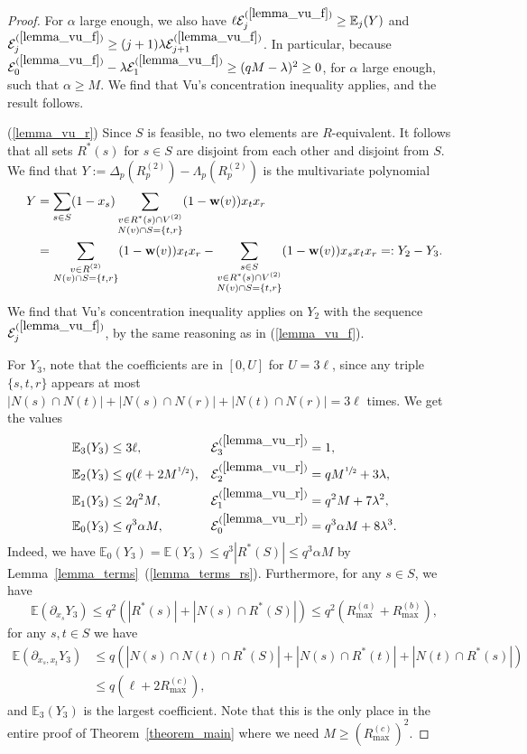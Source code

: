 \documentclass{article}
\theoremstyle{plain}
\theoremstyle{remark}
\theoremstyle{plain}
\numberwithin{equation}{section}
\renewcommand{\b}{{\bf{w}}}
\begin{document}
\begin{proof}
		For $\alpha$ large enough, we also have $\ell\mathcal{E}_j^{(\ref{lemma_vu_f})}\geq\mathbb{E}_j(Y)$ and $\mathcal{E}_j^{(\ref{lemma_vu_f})}\geq(j+1)\lambda\mathcal{E}_{j+1}^{(\ref{lemma_vu_f})}$. In particular, because $\mathcal{E}_0^{(\ref{lemma_vu_f})}-\lambda\mathcal{E}_1^{(\ref{lemma_vu_f})}\geq(qM-\lambda)^2\geq0$, for $\alpha$ large enough, such that $\alpha\geq M$. We find that Vu's concentration inequality applies, and the result follows.
		
		(\ref{lemma_vu_r}) Since $S$ is feasible, no two elements are $R$-equivalent. It follows that all sets $R^*(s)$ for $s\in S$ are disjoint from each other and disjoint from $S$. We find that $Y:=\Delta_p(R_p^{(2)})-\Lambda_p(R_p^{(2)})$ is the multivariate polynomial
		\begin{align}
			Y&=\sum_{s\in S}(1-x_s)\sum_{\substack{v\in R^*(s)\cap V^{(2)}\\N(v)\cap S=\{t,r\}}}(1-\b(v))x_tx_r
			\\&=\sum_{\substack{v\in R^{(2)}\\N(v)\cap S=\{t,r\}}}(1-\b(v))x_tx_r-\sum_{\substack{s\in S\\v\in R^*(s)\cap V^{(2)}\\N(v)\cap S=\{t,r\}}}(1-\b(v))x_sx_tx_r=:Y_2-Y_3.
		\end{align}
		We find that Vu's concentration inequality applies on $Y_2$ with the sequence $\mathcal{E}^{(\ref{lemma_vu_f})}_j$, by the same reasoning as in (\ref{lemma_vu_f}).
		
		For $Y_3$, note that the coefficients are in $[0,U]$ for $U=3\ell$, since any triple $\{s,t,r\}$ appears at most $|N(s)\cap N(t)|+|N(s)\cap N(r)|+|N(t)\cap N(r)|=3\ell$ times. We get the values
		\begin{align}
			\mathbb{E}_3(Y_3)&\leq3\ell,&\mathcal{E}_3^{(\ref{lemma_vu_r})}&=1,
			\\\mathbb{E}_2(Y_3)&\leq q(\ell+2M^{\sfrac12}),&\mathcal{E}_2^{(\ref{lemma_vu_r})}&=qM^{\sfrac12}+3\lambda,
			\\\mathbb{E}_1(Y_3)&\leq2q^2M,&\mathcal{E}_1^{(\ref{lemma_vu_r})}&=q^2M+7\lambda^2,
			\\\mathbb{E}_0(Y_3)&\leq q^3\alpha M,&\mathcal{E}_0^{(\ref{lemma_vu_r})}&=q^3\alpha M+8\lambda^3.
		\end{align}
		Indeed, we have $\mathbb{E}_0(Y_3)=\mathbb{E}(Y_3)\leq q^3|R^*(S)|\leq q^3\alpha M$ by Lemma~\ref{lemma_terms}~(\ref{lemma_terms_rs}). Furthermore, for any $s\in S$, we have $$\mathbb{E}(\partial_{x_s}Y_3)\leq q^2(|R^*(s)|+|N(s)\cap R^*(S)|)\leq q^2(R_{\max}^{(a)}+R_{\max}^{(b)}),$$ for any $s,t\in S$ we have
		\begin{align}
			\mathbb{E}(\partial_{x_s,x_t}Y_3)
			&\leq q(|N(s)\cap N(t)\cap R^*(S)|+|N(s)\cap R^*(t)|+|N(t)\cap R^*(s)|)
			\\&\leq q(\ell+2R_{\max}^{(c)}),
		\end{align}
		and $\mathbb{E}_3(Y_3)$ is the largest coefficient. Note that this is the only place in the entire proof of Theorem~\ref{theorem_main} where we need $M\geq(R_{\max}^{(c)})^2$.
		

\end{proof}
\end{document}
